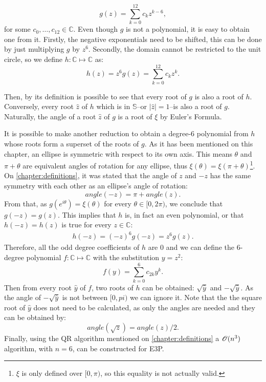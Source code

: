 \begin{equation}
g(z)=\sum_{k=0}^{12} c_k z^{k-6},
\end{equation}
for some $c_0, \dots, c_{12} \in \mathbb{C}$. Even though $g$ is not a polynomial, it is easy to obtain one from it. Firstly, the negative exponentials need to be shifted, this can be done by just multiplying $g$ by $z^6$. Secondly, the domain cannot be restricted to the unit circle, so we define $h : \mathbb{C} \mapsto \mathbb{C}$ as:
\begin{equation}
h(z) = z^6 g(z) = \sum_{k=0}^{12} c_k z^k.
\end{equation}

Then, by its definition is possible to see that every root of $g$ is also a root of $h$. Conversely, every root $\hat{z}$ of $h$ which is in $\mathbb{S}$--or $|\hat{z}|=1$--is also a root of $g$. Naturally, the angle of a root $\hat{z}$ of $g$ is a root of $\xi$ by Euler's Formula.

It is possible to make another reduction to obtain a degree-$6$ polynomial from $h$ whose roots form a superset of the roots of $g$. As it has been mentioned on this chapter, an ellipse is symmetric with respect to its own axis. This means $\theta$ and $\pi + \theta$ are equivalent angles of rotation for any ellipse, thus $\xi(\theta) = \xi(\pi + \theta)$\footnote{$\xi$ is only defined over $[0, \pi)$, so this equality is not actually valid.}. 
On \autoref{chapter:definitions}, it was stated that the angle of $z$ and $-z$ has the same symmetry with each other as an ellipse's angle of rotation:
\begin{equation*}
angle(-z) = \pi + angle(z).
\end{equation*}
From that, as $g(e^{i\theta})=\xi(\theta)$ for every $\theta \in [0, 2\pi)$, we conclude that $g(-z)=g(z)$. This implies that $h$ is, in fact an even polynomial, or that $h(-z) = h(z)$ is true for every $z\in\mathbb{C}$:
\begin{align}
h(-z) = (-z)^6g(-z) = z^6g(z).
\end{align}
Therefore, all the odd degree coefficients of $h$ are $0$ and we can define the $6$-degree polynomial $f : \mathbb{C} \mapsto \mathbb{C}$ with the substitution $y=z^2$:
\begin{equation}
f(y) = \sum_{k=0}^{6} c_{2k} y^k.
\end{equation}
Then from every root $\hat{y}$ of $f$, two roots of $h$ can be obtained: $\sqrt{\hat{y}}$ and $-\sqrt{\hat{y}}$. As the angle of $-\sqrt{\hat{y}}$ is not between $[0, pi)$ we can ignore it. Note that the the square root of $\hat{y}$ does not need to be calculated, as only the angles are needed and they can be obtained by:
\begin{equation}
angle(\sqrt{z}) = angle(z)/2.
\end{equation}
Finally, using the QR algorithm mentioned on \autoref{chapter:definitions} a $\mathscr{O}(n^3)$ algorithm, with $n=6$, can be constructed for E3P.

